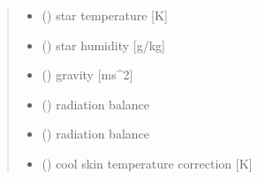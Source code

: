 \documentclass[letterpaper,10pt,english]{sphinxmanual}
\begin{document}
\begin{fulllineitems}
\begin{quote}
\begin{description}
\begin{itemize}
\item {} 
\sphinxAtStartPar
{} () \textendash{} star temperature              {[}K{]}

\item {} 
\sphinxAtStartPar
{} () \textendash{} star humidity                 {[}g/kg{]}

\item {} 
\sphinxAtStartPar
{} () \textendash{} gravity                      {[}ms\textasciicircum{}\sphinxhyphen{}2{]}

\item {} 
\sphinxAtStartPar
{} () \textendash{} radiation balance

\end{itemize}

\sphinxAtStartPar
\begin{itemize}
\item {} 
\sphinxAtStartPar
{} () \textendash{} radiation balance

\item {} 
\sphinxAtStartPar
{} () \textendash{} cool skin temperature correction {[}K{]}

\end{itemize}


\end{description}\end{quote}

\end{fulllineitems}

\end{document}
